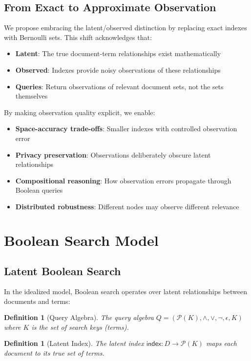 \documentclass[11pt,final,hidelinks]{article}
\newtheorem{definition}[theorem]{Definition}
\newcommand{\PS}[1]{\mathcal{P}(#1)}  %
\newcommand{\MakeIndex}{\mathsf{index}}
\begin{document}
\subsection{From Exact to Approximate Observation}

We propose embracing the latent/observed distinction by replacing exact indexes with Bernoulli sets. This shift acknowledges that:
\begin{itemize}
    \item \textbf{Latent}: The true document-term relationships exist mathematically
    \item \textbf{Observed}: Indexes provide noisy observations of these relationships
    \item \textbf{Queries}: Return observations of relevant document sets, not the sets themselves
\end{itemize}

By making observation quality explicit, we enable:
\begin{itemize}
    \item \textbf{Space-accuracy trade-offs}: Smaller indexes with controlled observation error
    \item \textbf{Privacy preservation}: Observations deliberately obscure latent relationships  
    \item \textbf{Compositional reasoning}: How observation errors propagate through Boolean queries
    \item \textbf{Distributed robustness}: Different nodes may observe different relevance
\end{itemize}

\section{Boolean Search Model}

\subsection{Latent Boolean Search}

In the idealized model, Boolean search operates over latent relationships between documents and terms:

\begin{definition}[Query Algebra]
The query algebra $Q = (\PS{K}, \land, \lor, \neg, \epsilon, K)$ where $K$ is the set of search keys (terms).
\end{definition}

\begin{definition}[Latent Index]
The latent index $\MakeIndex : D \to \PS{K}$ maps each document to its true set of terms.
\end{definition}
\end{document}
